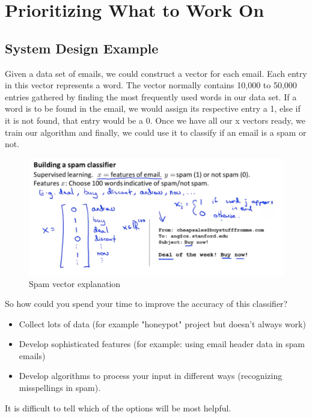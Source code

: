 \section{Prioritizing What to Work On}

\subsection{System Design Example}

Given a data set of emails, we could construct a vector for each email. Each entry in this vector represents a word. The vector normally contains 10,000 to 50,000 entries gathered by finding the most frequently used words in our data set. If a word is to be found in the email, we would assign its respective entry a 1, else if it is not found, that entry would be a 0. Once we have all our x vectors ready, we train our algorithm and finally, we could use it to classify if an email is a spam or not.

\begin{figure}[h!]
	\centering
	\includegraphics[width=1\textwidth]{fig/spam}
	\caption{Spam vector explanation}
\end{figure}

So how could you spend your time to improve the accuracy of this classifier?\\

\begin{itemize}
\item Collect lots of data (for example "honeypot" project but doesn't always work)
\item Develop sophisticated features (for example: using email header data in spam emails)
\item Develop algorithms to process your input in different ways (recognizing misspellings in spam).
\end{itemize}

It is difficult to tell which of the options will be most helpful.

